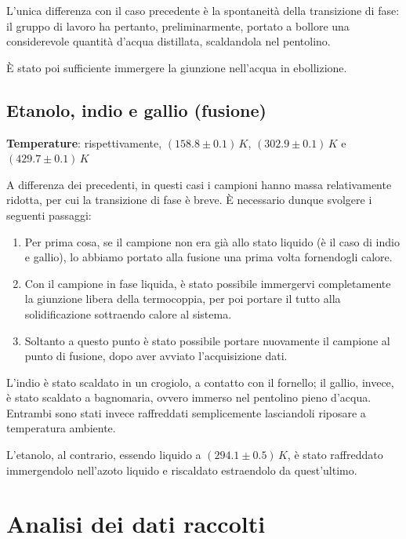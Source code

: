 \documentclass{article}
\begin{document}
L'unica differenza con il caso precedente è la spontaneità
della transizione di fase:
il gruppo di lavoro ha pertanto, preliminarmente, portato
a bollore una considerevole quantità d'acqua distillata,
scaldandola nel pentolino.

È stato poi sufficiente immergere la giunzione nell'acqua
in ebollizione.

\pagebreak
\subsection*{Etanolo, indio e gallio (fusione)}
\textbf{Temperature}: rispettivamente, $(158.8\pm0.1)\,\unit{K}$,
$(302.9\pm0.1)\,\unit{K}$ e $(429.7\pm0.1)\,\unit{K}$
\vspace{1mm}

A differenza dei precedenti, in questi casi i campioni
hanno massa relativamente ridotta, per cui la transizione
di fase è breve. È necessario dunque svolgere i seguenti passaggi:
\begin{enumerate}
  \item
    Per prima cosa, se il campione non era già allo stato liquido
    (è il caso di indio e gallio), lo abbiamo portato alla fusione
    una prima volta fornendogli calore.
  \item
    Con il campione in fase liquida, è stato possibile immergervi
    completamente la giunzione libera della termocoppia, per poi
    portare il tutto alla solidificazione sottraendo calore al
    sistema.
  \item
    Soltanto a questo punto è stato possibile portare nuovamente
    il campione al punto di fusione, dopo aver avviato l'acquisizione
    dati.
\end{enumerate}
L'indio è stato scaldato in un crogiolo, a contatto con il
fornello; il gallio, invece, è stato scaldato a bagnomaria,
ovvero immerso nel pentolino pieno d'acqua.
Entrambi sono stati invece raffreddati semplicemente
lasciandoli riposare a temperatura ambiente.

L'etanolo, al contrario, essendo liquido a $(294.1\pm0.5)\,\unit{K}$,
è stato raffreddato immergendolo nell'azoto liquido e riscaldato
estraendolo da quest'ultimo.


\section{Analisi dei dati raccolti}
\end{document}
